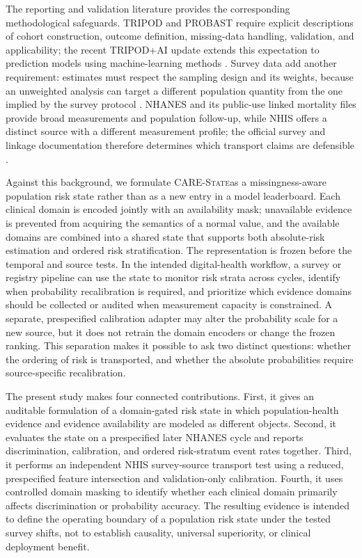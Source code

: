 \documentclass[12pt]{article}
\newcommand{\care}{\textsc{CARE-State}}
\begin{document}
The reporting and validation literature provides the corresponding methodological safeguards. TRIPOD and PROBAST require explicit descriptions of cohort construction, outcome definition, missing-data handling, validation, and applicability; the recent TRIPOD+AI update extends this expectation to prediction models using machine-learning methods \cite{collins_2015_tripod,wolff_2019_probaST,collins_2024_tripod_ai}. Survey data add another requirement: estimates must respect the sampling design and its weights, because an unweighted analysis can target a different population quantity from the one implied by the survey protocol \cite{lumley_2004_complex_survey}. NHANES and its public-use linked mortality files provide broad measurements and population follow-up, while NHIS offers a distinct source with a different measurement profile; the official survey and linkage documentation therefore determines which transport claims are defensible \cite{nchs_2024_nhanes_mortality}.

Against this background, we formulate \care as a missingness-aware population risk state rather than as a new entry in a model leaderboard. Each clinical domain is encoded jointly with an availability mask; unavailable evidence is prevented from acquiring the semantics of a normal value, and the available domains are combined into a shared state that supports both absolute-risk estimation and ordered risk stratification. The representation is frozen before the temporal and source tests. In the intended digital-health workflow, a survey or registry pipeline can use the state to monitor risk strata across cycles, identify when probability recalibration is required, and prioritize which evidence domains should be collected or audited when measurement capacity is constrained. A separate, prespecified calibration adapter may alter the probability scale for a new source, but it does not retrain the domain encoders or change the frozen ranking. This separation makes it possible to ask two distinct questions: whether the ordering of risk is transported, and whether the absolute probabilities require source-specific recalibration.

The present study makes four connected contributions. First, it gives an auditable formulation of a domain-gated risk state in which population-health evidence and evidence availability are modeled as different objects. Second, it evaluates the state on a prespecified later NHANES cycle and reports discrimination, calibration, and ordered risk-stratum event rates together. Third, it performs an independent NHIS survey-source transport test using a reduced, prespecified feature intersection and validation-only calibration. Fourth, it uses controlled domain masking to identify whether each clinical domain primarily affects discrimination or probability accuracy. The resulting evidence is intended to define the operating boundary of a population risk state under the tested survey shifts, not to establish causality, universal superiority, or clinical deployment benefit.
\end{document}
